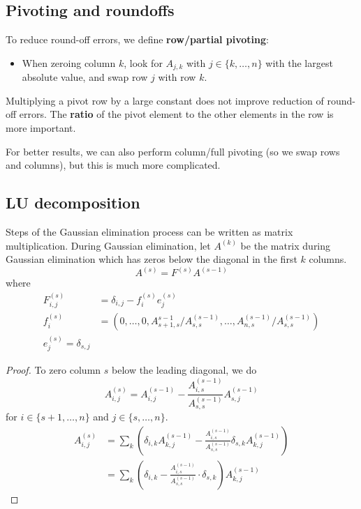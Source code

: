 \subsection{Pivoting and roundoffs}

\begin{definition}
	To reduce round-off errors, we define \textbf{row/partial pivoting}:
	\begin{itemize}
		\item When zeroing column $k$, look for $A_{j, k}$ with $j \in \{ k, \dots, n \}$ with the largest absolute value, and swap row $j$ with row $k$.
	\end{itemize}
\end{definition}

\begin{remark}
	Multiplying a pivot row by a large constant does not improve reduction of round-off errors. The \textbf{ratio} of the pivot element to the other elements in the row is more important. 
\end{remark}

\begin{remark}
	For better results, we can also perform column/full pivoting (so we swap rows and columns), but this is much more complicated.
\end{remark}

\subsection{LU decomposition}

\begin{lemma}
	Steps of the Gaussian elimination process can be written as matrix multiplication. During Gaussian elimination, let $A^{(k)}$ be the matrix during Gaussian elimination which has zeros below the diagonal in the first $k$ columns.
	\[
		A^{(s)} = F^{(s)} A^{(s - 1)}
	\]
	where
	\[
		\begin{aligned}
			F_{i, j}^(s) & = \delta_{i, j} - f_i^{(s)} e_j^{(s)} \\
			f_i^{(s)} & = (0, \dots, 0, A_{s+1, s}^{s-1} / A_{s,s}^{(s - 1)}, \dots, A_{n, s}^{(s - 1)} / A_{s, s}^{(s - 1)}) \\
			e_j^{(s)} = \delta_{s, j}
		\end{aligned}
	\]
\end{lemma}

\begin{proof}
	To zero column $s$ below the leading diagonal, we do
	\[
		A_{i, j}^{(s)} = A_{i, j}^{(s - 1)} - \frac{A_{i, s}^{(s - 1)}}{A_{s, s}^{(s - 1)}} A_{s, j}^{(s - 1)}
	\]
	for $i \in \{ s + 1, \dots, n \}$ and $j \in \{ s, \dots, n \}$.
	\[
		\begin{aligned}
			A_{i, j}^{(s)}
				& = \sum_k \left( \delta_{i, k} A_{k, j}^{(s - 1)} - \frac{A_{i, s}^{(s - 1)}}{A_{s, s}^{(s - 1)}} \delta_{s, k} A_{k, j}^{(s - 1)} \right) \\
				& = \sum_k \left( \delta_{i, k} - \frac{A_{i, s}^{(s - 1)}}{A_{s, s}^{(s - 1)}} \cdot \delta_{s, k} \right) A_{k, j}^{(s - 1)}
		\end{aligned}
	\]
\end{proof}

